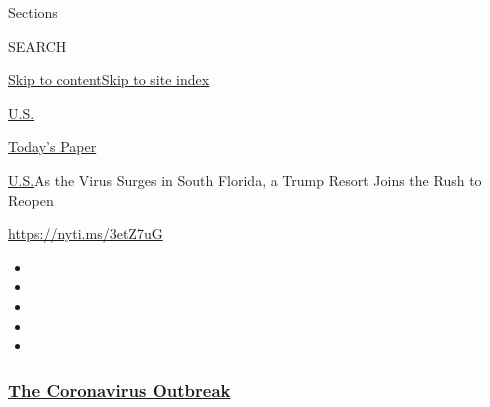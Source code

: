 Sections

SEARCH

\protect\hyperlink{site-content}{Skip to
content}\protect\hyperlink{site-index}{Skip to site index}

\href{https://www.nytimes3xbfgragh.onion/section/us}{U.S.}

\href{https://myaccount.nytimes3xbfgragh.onion/auth/login?response_type=cookie\&client_id=vi}{}

\href{https://www.nytimes3xbfgragh.onion/section/todayspaper}{Today's
Paper}

\href{/section/us}{U.S.}\textbar{}As the Virus Surges in South Florida,
a Trump Resort Joins the Rush to Reopen

\url{https://nyti.ms/3etZ7uG}

\begin{itemize}
\item
\item
\item
\item
\item
\end{itemize}

\hypertarget{the-coronavirus-outbreak}{%
\subsubsection{\texorpdfstring{\href{https://www.nytimes3xbfgragh.onion/news-event/coronavirus?name=styln-coronavirus-national\&region=TOP_BANNER\&block=storyline_menu_recirc\&action=click\&pgtype=Article\&impression_id=1b9820e0-f4c9-11ea-96c6-737460281ea1\&variant=undefined}{The
Coronavirus
Outbreak}}{The Coronavirus Outbreak}}\label{the-coronavirus-outbreak}}

